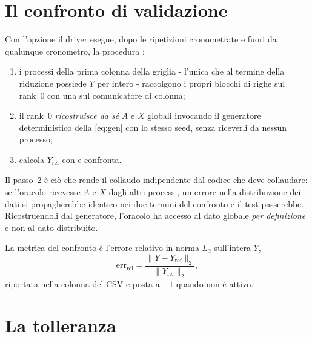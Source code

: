 \section{Il confronto di validazione}
\label{sec:oracolo-confronto}

Con l'opzione  il driver esegue, dopo le
ripetizioni cronometrate e fuori da qualunque cronometro, la procedura
:

\begin{enumerate}[nosep,left=0pt]
  \item i processi della prima colonna della griglia - l'unica che al termine
        della riduzione possiede $Y$ per intero - raccolgono i propri blocchi
        di righe sul rank~0 con una  sul comunicatore di
        colonna;
  \item il rank~0 \emph{ricostruisce da sé} $A$ e $X$ globali invocando il
        generatore deterministico della \cref{eq:gen} con lo stesso seed, senza
        riceverli da nessun processo;
  \item calcola $Y_{\text{ref}}$ con  e confronta.
\end{enumerate}

Il passo~2 è ciò che rende il collaudo indipendente dal codice che deve
collaudare: se l'oracolo ricevesse $A$ e $X$ dagli altri processi, un errore
nella distribuzione dei dati si propagherebbe identico nei due termini del
confronto e il test passerebbe. Ricostruendoli dal generatore, l'oracolo ha
accesso al dato globale \emph{per definizione} e non al dato distribuito.

La metrica del confronto è l'errore relativo in norma $L_2$ sull'intera $Y$,
\begin{equation}
  \mathrm{err}_{\text{rel}}
  =
  \frac{\lVert Y - Y_{\text{ref}} \rVert_2}{\lVert Y_{\text{ref}} \rVert_2},
  \label{eq:err-rel-oracolo}
\end{equation}
riportata nella colonna  del CSV e posta a $-1$ quando
 non è attivo.

\section{La tolleranza}
\label{sec:oracolo-tolleranza}

